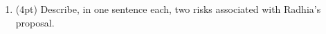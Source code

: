 \documentclass{report}
\newif\ifkey
\newcommand{\answerlong}[1]{\ifkey\color{red}\textbf{#1}\color{black}\else\vspace{0.5in}\fi\xspace}
\newcommand*{\pts}[1]{\addtocounter{points}{#1}(#1pt)}
\begin{document}
\begin{spacing}{1.4}
\begin{enumerate}[leftmargin=*]
\begin{enumerate}
  \item \pts{4} Describe, in one sentence each, two risks associated with Radhia's proposal.\\
    \answerlong{Any two of the following sentences would be a good answer (other answers are possible).
      Reducing integration testing may increase the risk that bugs at the boundary between modules are not detected.
      Static analysis may produce too many false positive alarms.
      Static analysis may be unsound or may miss bugs (even of the kind it is supposed to find).
      Static analysis errors may be too hard to understand.
    }
    \end{enumerate}

\newpage





\end{enumerate}
\end{spacing}
\end{document}
